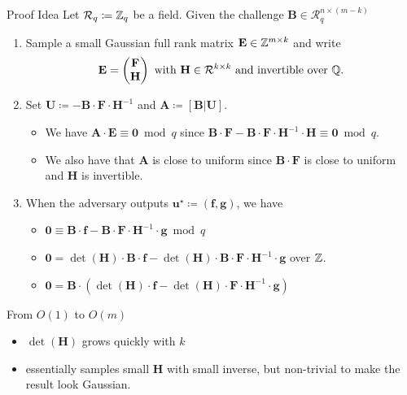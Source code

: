 \documentclass[xcolor=table,10pt,aspectratio=169]{beamer}
\renewcommand{\vec}[1]{\ensuremath{\mathbf{#1}}\xspace}
\providecommand{\mat}[1]{\ensuremath{\vec{#1}}\xspace}
\providecommand{\ring}[0]{\ensuremath{\mathcal{R}}\xspace}
\begin{document}
\begin{frame}[label={sec:orgbc771bb}]{Proof Idea}
Let \(\ring_{q} \coloneqq \ZZ_{q}\) be a field. Given the challenge \(\mat{B} \in \ring_{q}^{n \times (m-k)}\)
\begin{enumerate}
\item Sample a small Gaussian full rank matrix \(\mat{E} \in \ZZ^{m \times k}\) and write \[\mat{E} = \begin{pmatrix} \mat{F} \\ \mat{H}\end{pmatrix}\text{ with } \mat{H} \in \ring^{k \times k}\text{ and invertible over \(\QQ\)}.\]
\item Set \(\mat{U} \coloneqq -\mat{B} \cdot \mat{F} \cdot \mat{H}^{-1}\) and \(\mat{A} \coloneqq  [\mat{B} | \mat{U}]\).
\begin{itemize}
\item We have \(\mat{A} \cdot \mat{E} \equiv \mat{0} \bmod q\) since \(\mat{B} \cdot \mat{F} - \mat{B} \cdot \mat{F} \cdot \mat{H}^{-1} \cdot \mat{H} \equiv \mat{0} \bmod q\).
\item We also have that \(\mat{A}\) is close to uniform since \(\mat{B} \cdot \mat{F}\) is close to uniform and \(\mat{H}\) is invertible.
\end{itemize}
\item When the adversary outputs \(\vec{u}^{\star} \coloneqq (\vec{f}, \vec{g})\), we have
\begin{itemize}
\item \(\vec{0} \equiv \mat{B} \cdot \vec{f} - \mat{B} \cdot \mat{F} \cdot \mat{H}^{-1} \cdot \vec{g} \bmod q\)
\item \(\vec{0} = \det(\mat{H}) \cdot \mat{B} \cdot \vec{f} -  \det(\mat{H}) \cdot \mat{B} \cdot \mat{F} \cdot \mat{H}^{-1} \cdot \vec{g}\) over \(\mathbb{Z}\).
\item \(\vec{0} = \mat{B} \cdot \left(\det(\mat{H}) \cdot \vec{f} -  \det(\mat{H}) \cdot \mat{F} \cdot \mat{H}^{-1} \cdot \vec{g}\right)\)
\end{itemize}
\end{enumerate}
\end{frame}

\begin{frame}[label={sec:orgae8c75e}]{From \(O(1)\) to \(O(m)\)}
\begin{itemize}
\item \(\det(\mat{H})\) grows quickly with \(k\)
\item \cite{C:LPSS14} essentially samples small \(\mat{H}\) with small inverse, but non-trivial to make the result look Gaussian.
\end{itemize}
\end{frame}
\end{document}
